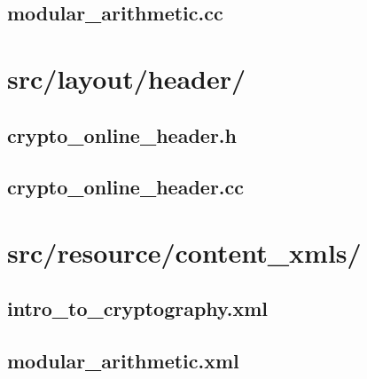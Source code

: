\subsection{modular_arithmetic.cc}

\newpage

\section{src/layout/header/}

\subsection{crypto_online_header.h}

\newpage

\subsection{crypto_online_header.cc}

\newpage

\section{src/resource/content_xmls/}

\subsection{intro_to_cryptography.xml}

\newpage

\subsection{modular_arithmetic.xml}

\newpage
